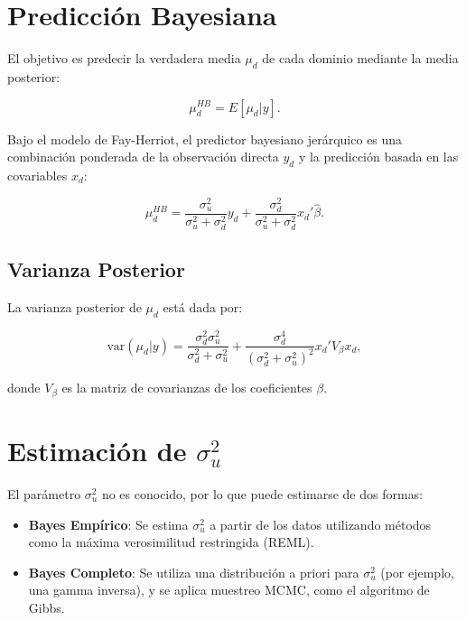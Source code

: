 \documentclass[12pt,spanish]{article}
\begin{document}
\section*{Predicción Bayesiana}

El objetivo es predecir la verdadera media \( \mu_d \) de cada dominio mediante la media posterior:

\begin{equation*}
    \mu_d^{HB} = E[\mu_d | y].
\end{equation*}

Bajo el modelo de Fay-Herriot, el predictor bayesiano jerárquico es una combinación ponderada de la observación directa \( y_d \) y la predicción basada en las covariables \( x_d \):

\begin{equation*}
    \mu_d^{HB} = \frac{\sigma^2_u}{\sigma^2_u + \sigma^2_d} y_d + \frac{\sigma^2_d}{\sigma^2_u + \sigma^2_d} x_d' \hat{\beta}.
\end{equation*}

\subsection*{Varianza Posterior}

La varianza posterior de \( \mu_d \) está dada por:

\begin{equation*}
    \text{var}(\mu_d | y) = \frac{\sigma^2_d \sigma^2_u}{\sigma^2_d + \sigma^2_u} + \frac{\sigma^4_d}{(\sigma^2_d + \sigma^2_u)^2} x_d' V_{\beta} x_d,
\end{equation*}

donde \( V_{\beta} \) es la matriz de covarianzas de los coeficientes \( \beta \).

\section*{Estimación de \( \sigma^2_u \)}

El parámetro \( \sigma^2_u \) no es conocido, por lo que puede estimarse de dos formas:

\begin{itemize}
    \item \textbf{Bayes Empírico}: Se estima \( \sigma^2_u \) a partir de los datos utilizando métodos como la máxima verosimilitud restringida (REML).
    \item \textbf{Bayes Completo}: Se utiliza una distribución a priori para \( \sigma^2_u \) (por ejemplo, una gamma inversa), y se aplica muestreo MCMC, como el algoritmo de Gibbs.
\end{itemize}
\end{document}
